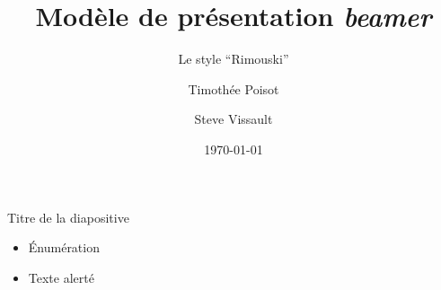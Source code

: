 \documentclass{eecslides}
\title[modèle \emph{beamer}]{Modèle de présentation \emph{beamer}}
\subtitle{Le style ``Rimouski''}
\author{Timothée Poisot \and Steve Vissault}
\institute{UQAR -- \emph{Theoretical Ecosystem Ecology}}
\date{\today} %
\begin{document}
	\frame[plain]{\titlepage}

	\begin{frame}{Titre de la diapositive}
	    
		\begin{itemize}
			\item Énumération
			\item Texte \alert{alerté} 
		\end{itemize}
	
	\end{frame}
\end{document}
